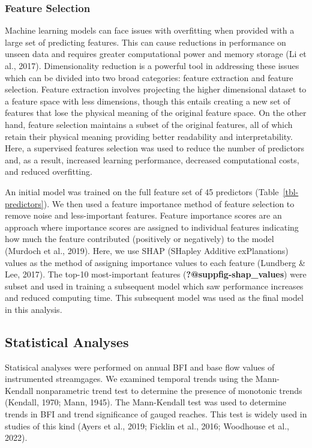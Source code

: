 \documentclass[
]{agujournal2019}
\begin{document}
\subsubsection{Feature Selection}\label{feature-selection}

Machine learning models can face issues with overfitting when provided
with a large set of predicting features. This can cause reductions in
performance on unseen data and requires greater computational power and
memory storage (Li et al., 2017). Dimensionality reduction is a powerful
tool in addressing these issues which can be divided into two broad
categories: feature extraction and feature selection. Feature extraction
involves projecting the higher dimensional dataset to a feature space
with less dimensions, though this entails creating a new set of features
that lose the physical meaning of the original feature space. On the
other hand, feature selection maintains a subset of the original
features, all of which retain their physical meaning providing better
readability and interpretability. Here, a supervised features selection
was used to reduce the number of predictors and, as a result, increased
learning performance, decreased computational costs, and reduced
overfitting.

An initial model was trained on the full feature set of 45 predictors
(Table~\ref{tbl-predictors}). We then used a feature importance method
of feature selection to remove noise and less-important features.
Feature importance scores are an approach where importance scores are
assigned to individual features indicating how much the feature
contributed (positively or negatively) to the model (Murdoch et al.,
2019). Here, we use SHAP (SHapley Additive exPlanations) values as the
method of assigning importance values to each feature (Lundberg \& Lee,
2017). The top-10 most-important features
(\textbf{?@suppfig-shap\_values}) were subset and used in training a
subsequent model which saw performance increases and reduced computing
time. This subsequent model was used as the final model in this
analysis.

\subsection{Statistical Analyses}\label{statistical-analyses}

Statisical analyses were performed on annual BFI and base flow values of
instrumented streamgages. We examined temporal trends using the
Mann-Kendall nonparametric trend test to determine the presence of
monotonic trends (Kendall, 1970; Mann, 1945). The Mann-Kendall test was
used to determine trends in BFI and trend significance of gauged
reaches. This test is widely used in studies of this kind (Ayers et al.,
2019; Ficklin et al., 2016; Woodhouse et al., 2022).
\end{document}
